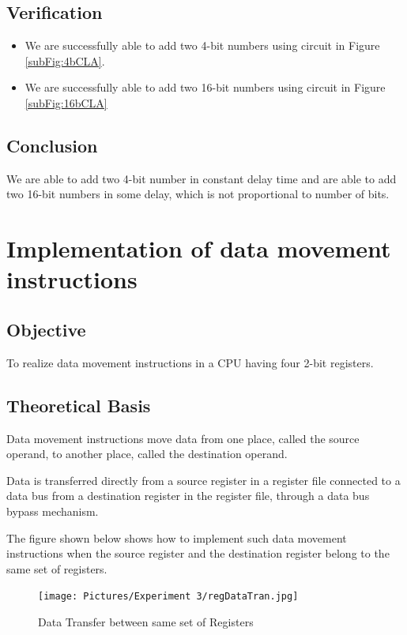 \documentclass[a4paper]{article}
\begin{document}
\subsection{Verification}
\begin{itemize}
    \item We are successfully able to add two 4-bit numbers using circuit in Figure \ref{subFig:4bCLA}.
    \item We are successfully able to add two 16-bit numbers using circuit in Figure \ref{subFig:16bCLA}
\end{itemize}

\subsection{Conclusion}
We are able to add two 4-bit number in constant delay time and are able to add two 16-bit numbers in some delay, which is not proportional to number of bits.
\pagebreak

\section{Implementation of data movement instructions}

\subsection{Objective}
To realize data movement instructions in a CPU having four 2-bit registers.

\subsection{Theoretical Basis}

\hspace{0.5cm}Data movement instructions move data from one place, called the source operand, to another place, called the destination operand.

Data is transferred directly from a source register in a register file connected to a data bus from a destination register in the register file, through a data bus bypass mechanism.

The figure shown below shows how to implement such data movement instructions when the source register and the destination register belong to the same set of registers.

\begin{figure}[h!]
    \centering
    \texttt{[image: Pictures/Experiment 3/regDataTran.jpg]}
    \caption{Data Transfer between same set of Registers}
    \label{fig:regDataTran}
\end{figure}
\end{document}
